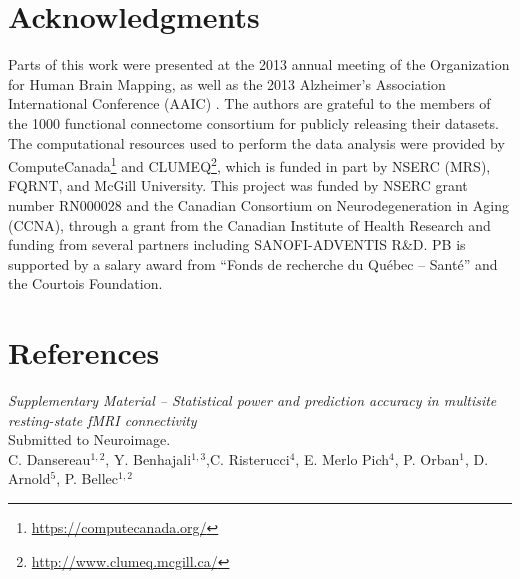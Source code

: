 \documentclass[authoryear]{elsarticle}
\begin{document}
\section{Acknowledgments}
Parts of this work were presented at the 2013 annual meeting of the Organization for Human Brain Mapping, as well as the 2013 Alzheimer's Association International Conference (AAIC) \citep{Dansereau2013b}. The authors are grateful to the members of the 1000 functional connectome consortium for publicly releasing their datasets. The computational resources used to perform the data analysis were provided by ComputeCanada\footnote{\url{https://computecanada.org/}} and CLUMEQ\footnote{\url{http://www.clumeq.mcgill.ca/}}, which is funded in part by NSERC (MRS), FQRNT, and McGill University. This project was funded by NSERC grant number RN000028 and the Canadian
Consortium on Neurodegeneration in Aging (CCNA), through a grant from
the Canadian Institute of Health Research and funding from several partners including SANOFI-ADVENTIS R\&D. PB is supported by a salary award from ``Fonds de recherche du Qu\'ebec -- Sant\'e'' and the Courtois Foundation.

\section*{References}





\pagebreak



\clearpage
\appendix


\clearpage
\pagebreak
\renewcommand{\thefigure}{S\arabic{figure}}
\renewcommand{\thetable}{S\arabic{table}}
\setcounter{figure}{0}
\begin{center}
\emph{Supplementary Material {--} Statistical power and prediction accuracy in multisite resting-state fMRI connectivity}\\

\vspace{\baselineskip}Submitted to Neuroimage.\\

\vspace{\baselineskip}C. Dansereau$^{1,2}$,  Y. Benhajali$^{1,3}$,C. Risterucci$^{4}$, E. Merlo Pich$^{4}$, P. Orban$^{1}$, D. Arnold$^{5}$, P. Bellec$^{1,2}$\\

\end{center}
\end{document}

